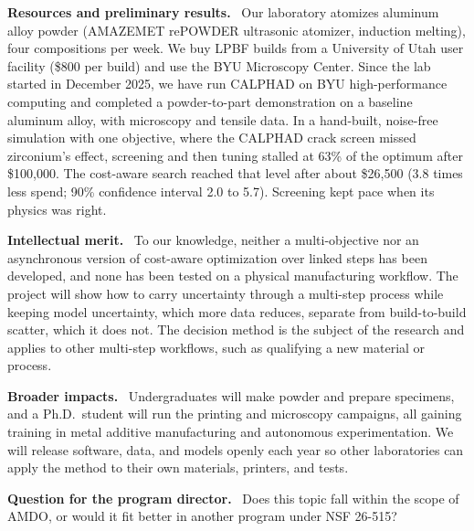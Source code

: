 \documentclass[11pt,letterpaper]{article}
\newcommand{\head}[1]{\textbf{#1.}\ }
\begin{document}
\head{Resources and preliminary results}
Our laboratory atomizes aluminum alloy powder (AMAZEMET rePOWDER
ultrasonic atomizer, induction melting), four compositions per week. We buy
LPBF builds from a University of Utah user facility (\$800 per build) and use
the BYU Microscopy Center. Since the
lab started in December 2025, we have run CALPHAD on BYU high-performance
computing and completed a powder-to-part demonstration on a baseline aluminum
alloy, with microscopy and tensile data. In a hand-built, noise-free
simulation with one objective, where the CALPHAD crack screen missed
zirconium's effect, screening and then tuning stalled at 63\% of the optimum
after \$100,000. The cost-aware search reached that level after about
\$26,500 (3.8 times less spend; 90\% confidence interval 2.0 to 5.7).
Screening kept pace when its physics was right.

\head{Intellectual merit}
To our knowledge, neither a multi-objective nor an asynchronous version of
cost-aware optimization over linked steps has been developed, and none has
been tested on a physical manufacturing workflow. The project will show
how to carry uncertainty through a multi-step process while keeping model
uncertainty, which more data reduces, separate from build-to-build scatter,
which it does not. The decision method is the subject of the research and
applies to other multi-step workflows, such as qualifying a new material or
process.

\head{Broader impacts}
Undergraduates will make powder and prepare specimens, and a Ph.D.\ student
will run the printing and microscopy campaigns, all gaining training in metal
additive manufacturing and autonomous experimentation. We will release
software, data, and models openly each year so other laboratories can apply
the method to their own materials, printers, and tests.

\head{Question for the program director}
Does this topic fall within the scope of AMDO, or would it fit better in
another program under NSF 26-515?
\end{document}
